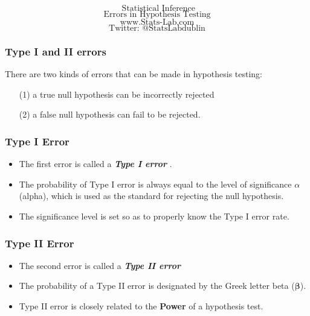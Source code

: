 \documentclass[]{beamer}
\begin{document}

\begin{frame}
\Huge
\[ \mbox{ Statistical Inference}\]
\LARGE
\[\mbox{Errors in Hypothesis Testing}\]
\Large
\[\mbox{www.Stats-Lab.com}\]
\[\mbox{Twitter: @StatsLabdublin}\]
\end{frame}
\begin{frame}
\vspace{-1cm}
\Large
\frametitle{Type I and II errors}
\Large
There are two kinds of errors that can be made in hypothesis testing:
\begin{itemize}
\item[(1)] a true null hypothesis can be incorrectly rejected
\item[(2)] a false null hypothesis can fail to be rejected.
\end{itemize}
\end{frame}
\begin{frame}
\Large
\frametitle{Type I Error}
\begin{itemize}
\item The first error is called a \textbf{\emph{Type I error}} . \\ 
\item The probability of Type I error is always equal to the level of significance $\alpha$ (alpha), which is used as the standard for rejecting the null hypothesis.
\item The significance level is set so as to properly know the Type I error rate. 
\end{itemize}
\end{frame}
\begin{frame}
\Large
\frametitle{Type II Error}
\begin{itemize}
\item The second error is called a \textbf{\emph{Type II error}}
\item The probability of a Type II error is designated by the Greek letter beta ($\boldsymbol{\beta}$).
\item Type II error
 is closely related to the \textbf{Power} of a hypothesis test.
 \end{itemize}
 \end{frame}
\end{document}
